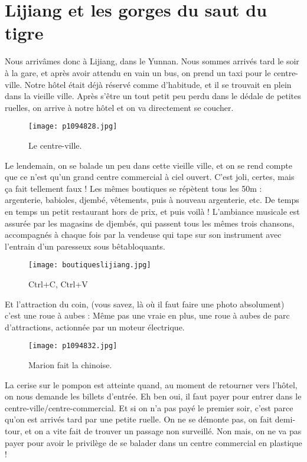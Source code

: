 \documentclass{book}
\begin{document}
\chapter{Lijiang et les gorges du saut du tigre}
Nous arrivâmes donc à Lijiang, dans le Yunnan. Nous sommes arrivés tard le soir à la gare, et après avoir attendu en vain un bus, on prend un taxi pour le centre-ville. Notre hôtel était déjà réservé comme d'habitude, et il se trouvait en plein dans la vieille ville. Après s'être un tout petit peu perdu dans le dédale de petites ruelles, on arrive à notre hôtel et on va directement se coucher.


\begin{figure}[h]
\centering
\texttt{[image: p1094828.jpg]}
\caption*{Le centre-ville.}
\end{figure}

Le lendemain, on se balade un peu dans cette vieille ville, et on se rend compte que ce n'est qu'un grand centre commercial à ciel ouvert. C'est joli, certes, mais ça fait tellement faux ! Les mêmes boutiques se répètent tous les 50m : argenterie, babioles, djembé, vêtements, puis à nouveau argenterie, etc. De temps en temps un petit restaurant hors de prix, et puis voilà ! L'ambiance musicale est assurée par les magasins de djembés, qui passent tous les mêmes trois chansons, accompagnés à chaque fois par la vendeuse qui tape sur son instrument avec l'entrain d'un paresseux sous bêtabloquants.


\begin{figure}[h]
\centering
\texttt{[image: boutiqueslijiang.jpg]}
\caption*{Ctrl+C, Ctrl+V}
\end{figure}

Et l'attraction du coin, (vous savez, là où il faut faire une photo absolument) c'est une roue à aubes : Même pas une vraie en plus, une roue à aubes de parc d'attractions, actionnée par un moteur électrique.


\begin{figure}[h]
\centering
\texttt{[image: p1094832.jpg]}
\caption*{Marion fait la chinoise.}
\end{figure}

La cerise sur le pompon est atteinte quand, au moment de retourner vers l'hôtel, on nous demande les billets d'entrée. Eh ben oui, il faut payer pour entrer dans le centre-ville/centre-commercial. Et si on n'a pas payé le premier soir, c'est parce qu'on est arrivés tard par une petite ruelle. On ne se démonte pas, on fait demi-tour, et on a vite fait de trouver un passage non surveillé. Non mais, on ne va pas payer pour avoir le privilège de se balader dans un centre commercial en plastique !
\end{document}
